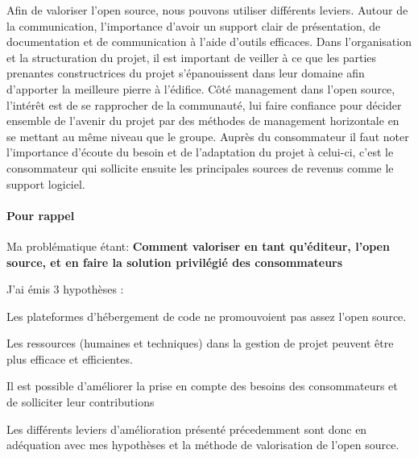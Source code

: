 		Afin de valoriser l'open source, nous pouvons utiliser différents leviers. 
		Autour de la communication, l'importance d'avoir un support clair de présentation, de documentation et de communication à l'aide d'outils efficaces.
		Dans l'organisation et la structuration du projet, il est important de veiller à ce que les parties prenantes constructrices du projet s'épanouissent dans leur domaine afin d'apporter la meilleure pierre à l'édifice. Côté management dans l'open source, l'intérêt est de se rapprocher de la communauté, lui faire confiance pour décider ensemble de l'avenir du projet par des méthodes de management horizontale en se mettant au même niveau que le groupe. Auprès du consommateur il faut noter l'importance d'écoute du besoin et de l'adaptation du projet à celui-ci, c'est le consommateur qui sollicite ensuite les principales sources de revenus comme le support logiciel.

	\paragraph{Pour rappel\\}

		Ma problématique étant: 
		\textbf{Comment valoriser en tant qu'éditeur, l'open source, et en faire la solution privilégié des consommateurs}

		J'ai émis 3 hypothèses : 

		\begin{description}[font=\color{burntorange}]
		\item[Sensibiliser à l'open source: ] Les plateformes d'hébergement de code ne promouvoient pas assez l'open source.
		\item[Optimisation des ressources: ] Les ressources (humaines et techniques) dans la gestion de projet peuvent être plus efficace et efficientes.
		\item[Besoin et envie de contribution: ] Il est possible d'améliorer la prise en compte des besoins des consommateurs et de solliciter leur contributions
		\end{description}

		Les différents leviers d'amélioration présenté précedemment sont donc en adéquation avec mes hypothèses et la méthode de valorisation de l'open source.
